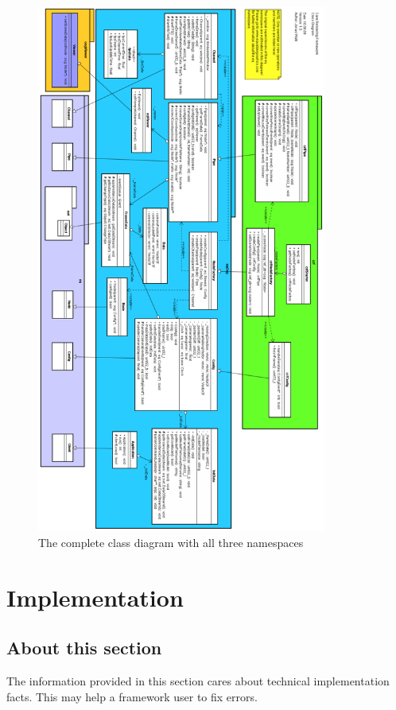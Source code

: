 \begin{figure}[H]
	\centering
		\includegraphics[width=0.850\textwidth,angle=180]{../figures/crf_class_diagram_complete_01}
	\caption{The complete class diagram with all three namespaces}
	\label{fig:crf_class_diagram_complete_01}
\end{figure}

\section{Implementation}
\subsection{About this section}
The information provided in this section cares about technical implementation facts. This may help a framework user to fix errors.

